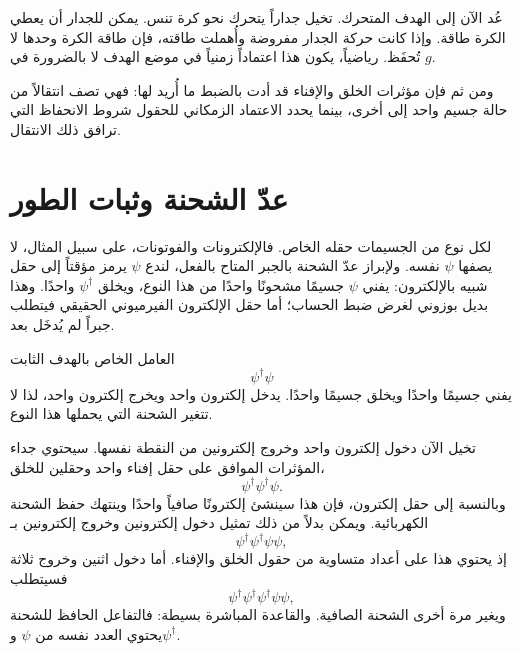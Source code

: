 عُد الآن إلى الهدف المتحرك. تخيل جداراً يتحرك نحو كرة تنس. يمكن للجدار أن يعطي الكرة طاقة. وإذا كانت حركة الجدار مفروضة وأُهملت طاقته، فإن طاقة الكرة وحدها لا تُحفَظ. رياضياً، يكون هذا اعتماداً زمنياً في موضع الهدف لا بالضرورة في \(g\).

ومن ثم فإن مؤثرات الخلق والإفناء قد أدت بالضبط ما أُريد لها: فهي تصف انتقالاً من حالة جسيم واحد إلى أخرى، بينما يحدد الاعتماد الزمكاني للحقول شروط الانحفاظ التي ترافق ذلك الانتقال.

\section{عدّ الشحنة وثبات الطور}

لكل نوع من الجسيمات حقله الخاص. فالإلكترونات والفوتونات، على سبيل المثال، لا يصفها \(\psi\) نفسه. ولإبراز عدّ الشحنة بالجبر المتاح بالفعل، لندع \(\psi\) يرمز مؤقتاً إلى حقل شبيه بالإلكترون: يفني \(\psi\) جسيمًا مشحونًا واحدًا من هذا النوع، ويخلق \(\psi^\dagger\) واحدًا. وهذا بديل بوزوني لغرض ضبط الحساب؛ أما حقل الإلكترون الفيرميوني الحقيقي فيتطلب جبراً لم يُدخَل بعد.

العامل الخاص بالهدف الثابت
\begin{equation}
\psi^\dagger\psi
\end{equation}
يفني جسيمًا واحدًا ويخلق جسيمًا واحدًا. يدخل إلكترون واحد ويخرج إلكترون واحد، لذا لا تتغير الشحنة التي يحملها هذا النوع.

تخيل الآن دخول إلكترون واحد وخروج إلكترونين من النقطة نفسها. سيحتوي جداء المؤثرات الموافق على حقل إفناء واحد وحقلين للخلق،
\begin{equation}
\psi^\dagger\psi^\dagger\psi.
\end{equation}
وبالنسبة إلى حقل إلكترون، فإن هذا سينشئ إلكترونًا صافياً واحدًا وينتهك حفظ الشحنة الكهربائية. ويمكن بدلاً من ذلك تمثيل دخول إلكترونين وخروج إلكترونين بـ
\begin{equation}
\psi^\dagger\psi^\dagger\psi\psi,
\end{equation}
إذ يحتوي هذا على أعداد متساوية من حقول الخلق والإفناء. أما دخول اثنين وخروج ثلاثة فسيتطلب
\begin{equation}
\psi^\dagger\psi^\dagger\psi^\dagger\psi\psi,
\end{equation}
ويغير مرة أخرى الشحنة الصافية. والقاعدة المباشرة بسيطة: فالتفاعل الحافظ للشحنة يحتوي العدد نفسه من \(\psi\) و\(\psi^\dagger\).

\begin{classroomqa}
\end{classroomqa}

